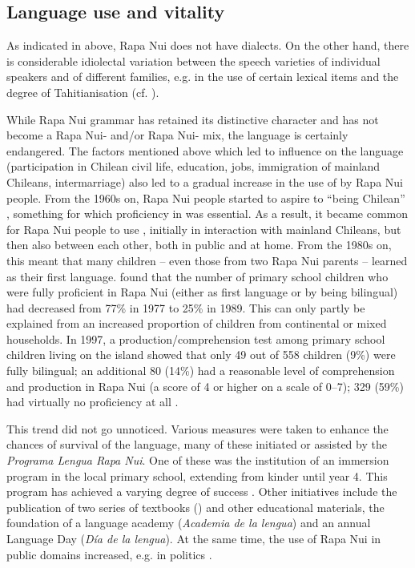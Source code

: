 \subsection{Language use and vitality}\label{sec:1.4.3}
\largerpage
As indicated in  above, Rapa Nui does not have dialects. On the other hand, there is considerable idiolectal variation between the speech varieties of individual speakers and of different families, e.g. in the use of certain lexical items and the degree of Tahitianisation (cf. \citealt[154]{Fischer2008Reversing}).

While Rapa Nui grammar has retained its distinctive character and has not become a Rapa Nui- and/or Rapa Nui- mix, the language is certainly endangered. The factors mentioned above which led to  influence on the language (participation in Chilean civil life, education, jobs, immigration of mainland Chileans, intermarriage) also led to a gradual increase in the use of  by Rapa Nui people. From the 1960s on, Rapa Nui people started to aspire to “being Chilean” \citep[315]{Fischer2001Hispan}, something for which proficiency in  was essential. As a result, it became common for Rapa Nui people to use , initially in interaction with mainland Chileans, but then also between each other, both in public and at home. From the 1980s on, this meant that many children – even those from two Rapa Nui parents – learned  as their first language. \citet{WeberWeber1990Sobrevivir} found that the number of primary school children who were fully proficient in Rapa Nui (either as first language or by being bilingual) had decreased from 77\% in 1977 to 25\% in 1989. This can only partly be explained from an increased proportion of children from continental or mixed households. In 1997, a production/comprehension test among primary school children living on the island showed that only 49 out of 558 children (9\%) were fully bilingual; an additional 80 (14\%) had a reasonable level of comprehension and production in Rapa Nui (a score of 4 or higher on a scale of 0–7); 329 (59\%) had virtually no proficiency at all \citep{WeberWeber1998}. 

This trend did not go unnoticed. Various measures were taken to enhance the chances of survival of the language, many of these initiated or assisted by the \textit{Programa Lengua Rapa Nui}. One of these was the institution of an immersion program in the local primary school, extending from kinder until year 4. This program has achieved a varying degree of success \citep{Makihara2009}. Other initiatives include the publication of two series of textbooks (\citealt{WeberWeber1990Mai,WeberWeber1990Mo}) and other educational materials, the foundation of a language academy (\textit{Academia de la lengua}) and an annual Language Day (\textit{Día de la lengua}). At the same time, the use of Rapa Nui in public domains increased, e.g. in politics \citep[204]{Makihara2001Adaptation}. 

